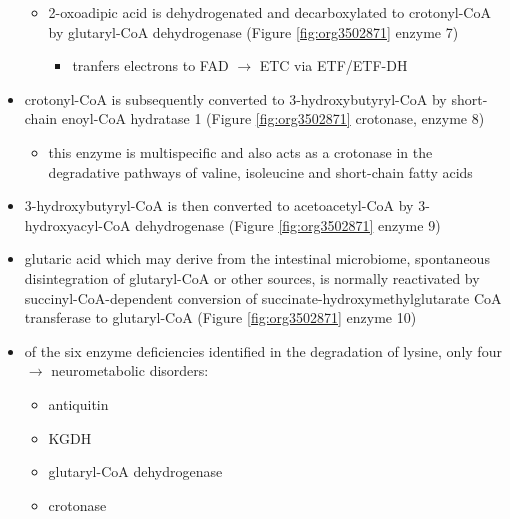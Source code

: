 \documentclass{scrartcl}
\begin{document}
\begin{itemize}
\begin{itemize}
\item 2-oxoadipic acid is dehydrogenated and decarboxylated to
crotonyl-CoA by glutaryl-CoA dehydrogenase (Figure \ref{fig:org3502871} enzyme 7)
\begin{itemize}
\item tranfers electrons to FAD \(\to\) ETC via ETF/ETF-DH
\end{itemize}
\end{itemize}

\item crotonyl-CoA is subsequently converted to 3-hydroxybutyryl-CoA by
short-chain enoyl-CoA hydratase 1 (Figure \ref{fig:org3502871} crotonase, enzyme 8)
\begin{itemize}
\item this enzyme is multispecific and also acts as a crotonase in the
degradative pathways of valine, isoleucine and short-chain fatty
acids
\end{itemize}

\item 3-hydroxybutyryl-CoA is then converted to acetoacetyl-CoA by
3-hydroxyacyl-CoA dehydrogenase (Figure \ref{fig:org3502871} enzyme 9)
\item glutaric acid which may derive from the intestinal microbiome,
spontaneous disintegration of glutaryl-CoA or other sources, is
normally reactivated by succinyl-CoA-dependent conversion of
succinate-hydroxymethylglutarate CoA transferase to glutaryl-CoA
(Figure \ref{fig:org3502871} enzyme 10)

\item of the six enzyme deficiencies identified in the degradation of
lysine, only four \(\to\) neurometabolic disorders:
\begin{itemize}
\item antiquitin
\item KGDH
\item glutaryl-CoA dehydrogenase
\item crotonase
\end{itemize}
\end{itemize}
\end{document}
